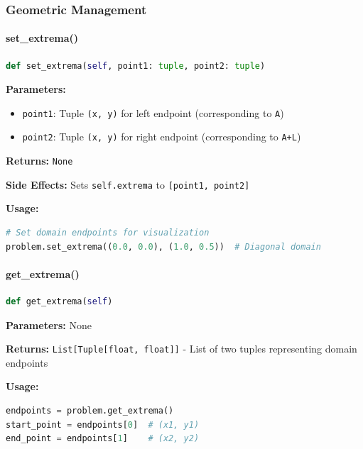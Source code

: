 \subsubsection{Geometric Management}

\paragraph{set\_extrema()}\leavevmode
\begin{lstlisting}[language=Python, caption=Set Extrema Method]
def set_extrema(self, point1: tuple, point2: tuple)
\end{lstlisting}

\textbf{Parameters:}
\begin{itemize}
    \item \texttt{point1}: Tuple \texttt{(x, y)} for left endpoint (corresponding to \texttt{A})
    \item \texttt{point2}: Tuple \texttt{(x, y)} for right endpoint (corresponding to \texttt{A+L})
\end{itemize}

\textbf{Returns:} \texttt{None}

\textbf{Side Effects:} Sets \texttt{self.extrema} to \texttt{[point1, point2]}

\textbf{Usage:}
\begin{lstlisting}[language=Python, caption=Set Extrema Usage]
# Set domain endpoints for visualization
problem.set_extrema((0.0, 0.0), (1.0, 0.5))  # Diagonal domain
\end{lstlisting}

\paragraph{get\_extrema()}\leavevmode
\begin{lstlisting}[language=Python, caption=Get Extrema Method]
def get_extrema(self)
\end{lstlisting}

\textbf{Parameters:} None

\textbf{Returns:} \texttt{List[Tuple[float, float]]} - List of two tuples representing domain endpoints

\textbf{Usage:}
\begin{lstlisting}[language=Python, caption=Get Extrema Usage]
endpoints = problem.get_extrema()
start_point = endpoints[0]  # (x1, y1)
end_point = endpoints[1]    # (x2, y2)
\end{lstlisting}

